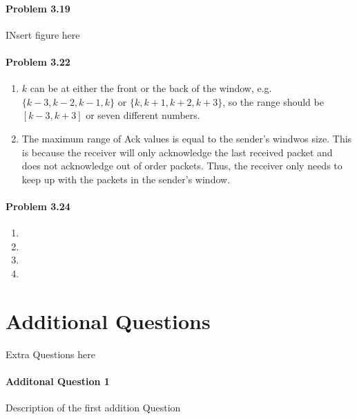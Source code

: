 \documentclass[12pt]{article}
\begin{document}
\paragraph{Problem 3.19}
INsert figure here

\paragraph{ Problem 3.22}
\begin{enumerate}[label=\textbf{Part \arabic*)}]
	\item $k$ can be at either the front or the back of the window, e.g. $\{k-3, k-2, k-1, k\}$ or $\{k, k+1, k+2, k+3\}$, so the range should be $[k-3, k+3]$ or seven different numbers. 
	\item The maximum range of Ack values is equal to the sender's windwos size. This is because the receiver will only acknowledge the last received packet and does not acknowledge out of order packets. Thus, the receiver only needs to keep up with the packets in the sender's window.
\end{enumerate}

\paragraph{Problem 3.24}
\begin{enumerate}[label=\textbf{Part \arabic*)}]
	\item 
	\item
	\item
	\item
\end{enumerate}
\section{Additional Questions}
Extra Questions here

\paragraph{Additonal Question 1}
Description of the first addition Question
\end{document}
